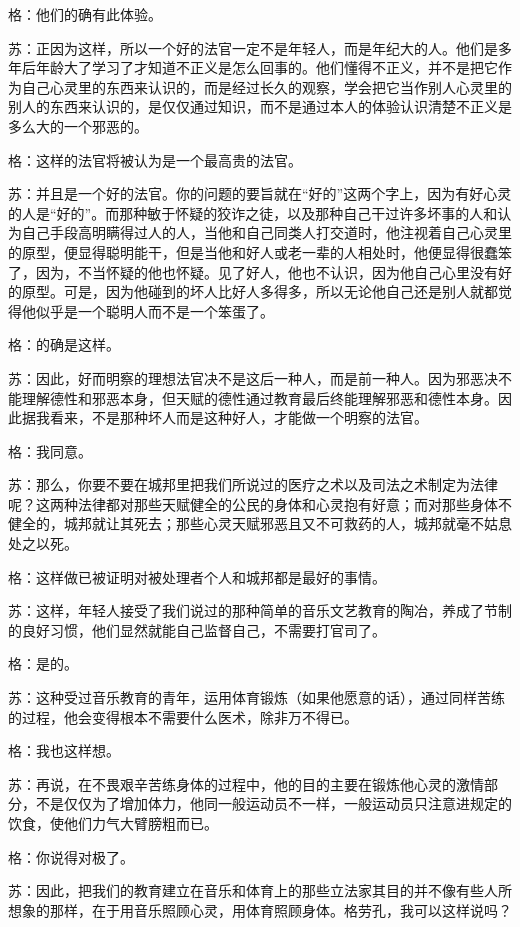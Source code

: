 \documentclass[12pt,oneside]{book}
\begin{document}
格：他们的确有此体验。

苏：正因为这样，所以一个好的法官一定不是年轻人，而是年纪大的人。他们是多年后年龄大了学习了才知道不正义是怎么回事的。他们懂得不正义，并不是把它作为自己心灵里的东西来认识的，而是经过长久的观察，学会把它当作别人心灵里的别人的东西来认识的，是仅仅通过知识，而不是通过本人的体验认识清楚不正义是多么大的一个邪恶的。

格：这样的法官将被认为是一个最高贵的法官。

苏：并且是一个好的法官。你的问题的要旨就在“好的”这两个字上，因为有好心灵的人是“好的”。而那种敏于怀疑的狡诈之徒，以及那种自己干过许多坏事的人和认为自己手段高明瞒得过人的人，当他和自己同类人打交道时，他注视着自己心灵里的原型，便显得聪明能干，但是当他和好人或老一辈的人相处时，他便显得很蠢笨了，因为，不当怀疑的他也怀疑。见了好人，他也不认识，因为他自己心里没有好的原型。可是，因为他碰到的坏人比好人多得多，所以无论他自己还是别人就都觉得他似乎是一个聪明人而不是一个笨蛋了。

格：的确是这样。

苏：因此，好而明察的理想法官决不是这后一种人，而是前一种人。因为邪恶决不能理解德性和邪恶本身，但天赋的德性通过教育最后终能理解邪恶和德性本身。因此据我看来，不是那种坏人而是这种好人，才能做一个明察的法官。

格：我同意。

苏：那么，你要不要在城邦里把我们所说过的医疗之术以及司法之术制定为法律呢？这两种法律都对那些天赋健全的公民的身体和心灵抱有好意；而对那些身体不健全的，城邦就让其死去；那些心灵天赋邪恶且又不可救药的人，城邦就毫不姑息处之以死。

格：这样做已被证明对被处理者个人和城邦都是最好的事情。

苏：这样，年轻人接受了我们说过的那种简单的音乐文艺教育的陶冶，养成了节制的良好习惯，他们显然就能自己监督自己，不需要打官司了。

格：是的。

苏：这种受过音乐教育的青年，运用体育锻炼（如果他愿意的话），通过同样苦练的过程，他会变得根本不需要什么医术，除非万不得已。

格：我也这样想。

苏：再说，在不畏艰辛苦练身体的过程中，他的目的主要在锻炼他心灵的激情部分，不是仅仅为了增加体力，他同一般运动员不一样，一般运动员只注意进规定的饮食，使他们力气大臂膀粗而已。

格：你说得对极了。

苏：因此，把我们的教育建立在音乐和体育上的那些立法家其目的并不像有些人所想象的那样，在于用音乐照顾心灵，用体育照顾身体。格劳孔，我可以这样说吗？
\end{document}
